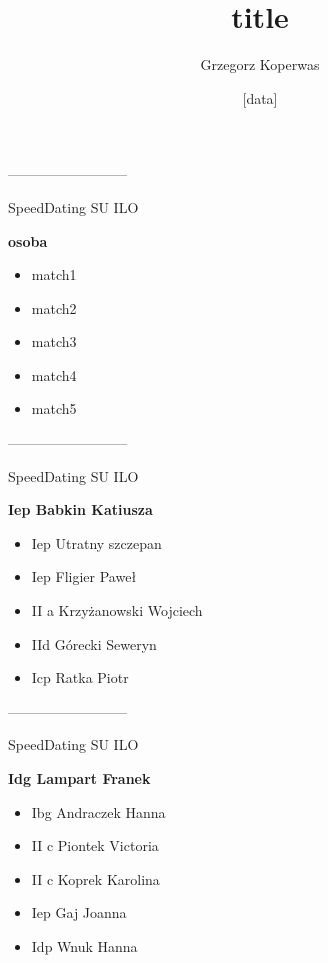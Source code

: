\documentclass[a4paper,10pt]{article}
\title{title}
\author{Grzegorz Koperwas}
\date{[data]}
\begin{document}
\begin{multicols}{3}



\begin{minipage}[l]{\textwidth}
--------------------------

  \footnotesize{SpeedDating SU ILO}

  \bfseries{osoba}

  \begin{itemize}
    \item match1
    \item match2
    \item match3
    \item match4
    \item match5

    \end{itemize}



\end{minipage}



\begin{minipage}[l]{\textwidth}
--------------------------

  \footnotesize{SpeedDating SU ILO}

  \bfseries{Iep Babkin Katiusza}

  \begin{itemize}
    \item Iep Utratny szczepan
    \item Iep Fligier Paweł
    \item II a Krzyżanowski Wojciech
    \item IId Górecki Seweryn
    \item Icp Ratka Piotr

    \end{itemize}



\end{minipage}



\begin{minipage}[l]{\textwidth}
--------------------------

  \footnotesize{SpeedDating SU ILO}

  \bfseries{Idg Lampart Franek}

  \begin{itemize}
    \item Ibg Andraczek Hanna
    \item II c Piontek Victoria
    \item II c Koprek Karolina
    \item Iep Gaj Joanna
    \item Idp Wnuk Hanna


\end{itemize}
\end{minipage}
\end{multicols}
\end{document}
